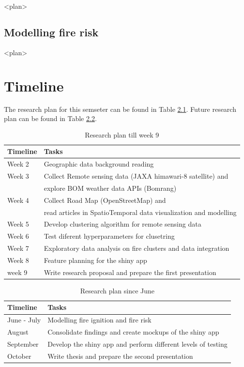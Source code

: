 \documentclass{monashthesis}
\begin{document}
\textless{}plan\textgreater{}

\section{Modelling fire risk}\label{modelling-fire-risk}

\textless{}plan\textgreater{}

\chapter{Timeline}\label{timeline}

The research plan for this semseter can be found in Table
\ref{tab:timeline1}. Future research plan can be found in Table
\ref{tab:timeline2}.

\begin{table}[!h]

\caption{\label{tab:timeline1}Research plan till week 9}
\centering
\begin{tabular}{ll}
\toprule
Timeline & Tasks\\
\midrule
Week 2 & Geographic data background reading\\
Week 3 & Collect Remote sensing data (JAXA himawari-8 satellite) and\\
 & explore BOM weather data APIs (Bomrang)\\
Week 4 & Collect Road Map (OpenStreetMap) and\\
 & read articles in SpatioTemporal data visualization and modelling\\
\addlinespace
Week 5 & Develop clustering algorithm for remote sensing data\\
Week 6 & Test diferent hyperparameters for clusetring\\
Week 7 & Exploratory data analysis on fire clusters and data integration\\
Week 8 & Feature planning for the shiny app\\
week 9 & Write research proposal and prepare the first presentation\\
\bottomrule
\end{tabular}
\end{table}

\begin{table}[!h]

\caption{\label{tab:timeline2}Research plan since June}
\centering
\begin{tabular}{ll}
\toprule
Timeline & Tasks\\
\midrule
June - July & Modelling fire ignition and fire risk\\
August & Consolidate findings and create mockups of the shiny app\\
September & Develop the shiny app and perform different levels of testing\\
October & Write thesis and prepare the second presentation\\
\bottomrule
\end{tabular}
\end{table}
\end{document}
